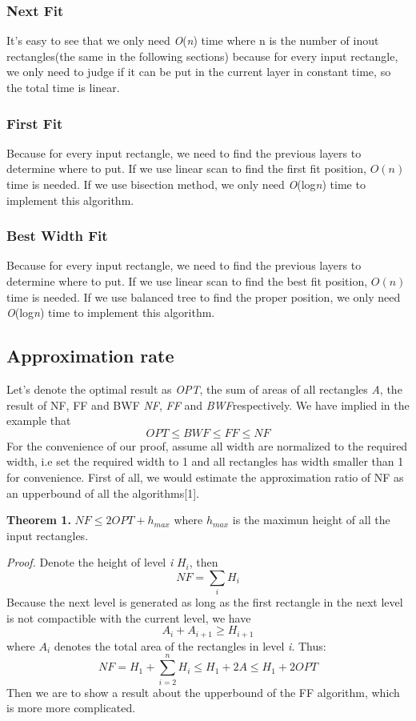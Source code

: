 \documentclass[12pt]{article}
\begin{document}
    \subsubsection{Next Fit}
    It's easy to see that we only need \emph{O}(\emph{n}) time where n 
    is the number of inout rectangles(the same in the following sections) because for every input rectangle, 
    we only need to judge if it can be put in the current layer in constant 
    time, so the total time is linear.

    \subsubsection{First Fit}
    Because for every input rectangle, we need to find the previous layers to 
    determine where to put. If we use linear scan to find the first fit position, 
    $O(n)$ time is needed. If we use bisection method, we only need 
    \emph{O}(log\emph{n}) time to implement this algorithm.

    \subsubsection{Best Width Fit}
    Because for every input rectangle, we need to find the previous layers to 
    determine where to put. If we use linear scan to find the best fit position, 
    $O(n)$ time is needed. If we use balanced tree to find the proper position, we only need 
    \emph{O}(log\emph{n}) time to implement this algorithm.

    \subsection{Approximation rate}
    Let’s denote the optimal result as \emph{OPT}, the sum of areas of all rectangles \emph{A}, the result of 
    NF, FF and BWF \emph{NF}, \emph{FF} and \emph{BWF}respectively. We have implied in the example that
    $$OPT \le BWF \le FF \le NF$$
    For the convenience of our proof, assume all width are normalized to the required width, 
    i.e set the required width to 1 and all rectangles has width smaller than 1 for convenience. 
    First of all, we would estimate the approximation ratio of NF as an upperbound of all the algorithms[1].

    \textbf{Theorem 1.} $NF \le 2OPT + h_{max}$ where $h_{max}$ is the maximun height of 
    all the input rectangles.

    \emph{Proof.} Denote the height of level \emph{i} $H_{i}$, then
    $$NF = \sum_{i}H_{i}$$
    Because the next level is generated as long as the first rectangle in the next level is not compactible 
    with the current level, we have
    $$A_{i} + A_{i+1} \ge H_{i+1}$$
    where $A_{i}$ denotes the total area of the rectangles in level \emph{i}. Thus:
    $$NF = H_{1} + \sum_{i=2}^{n}H_{i} \le H_{1} + 2A \le H_{1} + 2OPT$$
    Then we are to show a result about the upperbound of the FF algorithm, which is 
    more more complicated.
\end{document}

